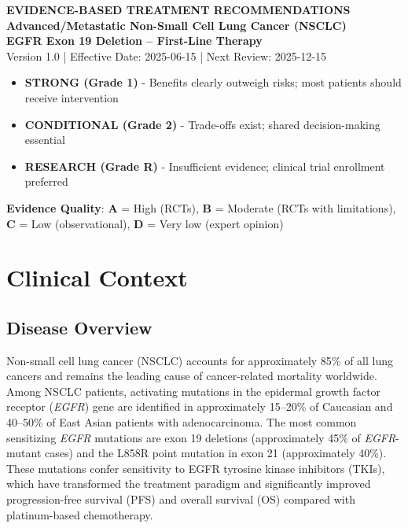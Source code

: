 \documentclass[10pt,letterpaper]{article}
\begin{document}
\begin{center}
{\fontsize{14}{16}\selectfont\bfseries\color{headerblue} EVIDENCE-BASED TREATMENT RECOMMENDATIONS}\\[2pt]
{\fontsize{12}{14}\selectfont\bfseries Advanced/Metastatic Non-Small Cell Lung Cancer (NSCLC)}\\[2pt]
{\fontsize{11}{13}\selectfont\bfseries EGFR Exon 19 Deletion -- First-Line Therapy}\\[2pt]
{\fontsize{9}{11}\selectfont Version 1.0 | Effective Date: 2025-06-15 | Next Review: 2025-12-15}
\end{center}

\vspace{4pt}

\begin{tcolorbox}[colback=highlightgray,colframe=black,title=\textbf{Recommendation Strength Key},fonttitle=\bfseries\small,coltitle=black]
{\small
\begin{itemize}
\item \colorbox{stronggreen!30}{\textbf{STRONG (Grade 1)}} - Benefits clearly outweigh risks; most patients should receive intervention
\item \colorbox{conditionalyellow!30}{\textbf{CONDITIONAL (Grade 2)}} - Trade-offs exist; shared decision-making essential
\item \colorbox{researchblue!30}{\textbf{RESEARCH (Grade R)}} - Insufficient evidence; clinical trial enrollment preferred
\end{itemize}

\textbf{Evidence Quality}: \textbf{A} = High (RCTs), \textbf{B} = Moderate (RCTs with limitations), \textbf{C} = Low (observational), \textbf{D} = Very low (expert opinion)
}
\end{tcolorbox}

\vspace{2pt}

\section{Clinical Context}

\subsection{Disease Overview}

Non-small cell lung cancer (NSCLC) accounts for approximately 85\% of all lung cancers and remains the leading cause of cancer-related mortality worldwide. Among NSCLC patients, activating mutations in the epidermal growth factor receptor (\textit{EGFR}) gene are identified in approximately 15--20\% of Caucasian and 40--50\% of East Asian patients with adenocarcinoma. The most common sensitizing \textit{EGFR} mutations are exon 19 deletions (approximately 45\% of \textit{EGFR}-mutant cases) and the L858R point mutation in exon 21 (approximately 40\%). These mutations confer sensitivity to EGFR tyrosine kinase inhibitors (TKIs), which have transformed the treatment paradigm and significantly improved progression-free survival (PFS) and overall survival (OS) compared with platinum-based chemotherapy.
\end{document}
